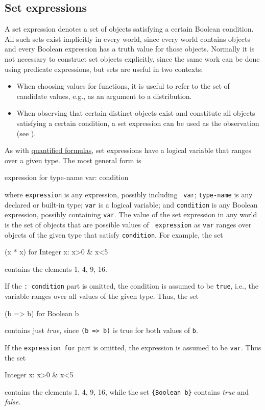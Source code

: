 \documentclass[12pt]{article}
\begin{document}
\subsection{Set expressions}\label{set-section}
A set expression denotes a set of objects satisfying a certain
Boolean condition. All such sets exist implicitly in every world,
since every world contains objects and every Boolean expression
has a truth value for those objects. Normally it is not necessary to
construct set objects explicitly, since the same work can be done
using predicate expressions, but sets are useful in two contexts:
\begin{itemize}
\item When choosing values for functions, it is useful to refer to the
  set of candidate values, e.g., as an argument to a distribution.
\item When observing that certain distinct objects exist
and constitute all objects satisfying a certain condition,
a set expression can be used as the observation (see ).
\end{itemize}
As with \hyperref[quantifier-section]{quantified formulas}, set
expressions have a logical variable that ranges over a given type.
The most general form is
\begin{blogcode}
{expression for type-name var: condition}
\end{blogcode}
where {\tt expression} is any expression, possibly including {\tt
  var}; {\tt type-name} is any declared or built-in type; {\tt var} is
a logical variable; and {\tt condition} is any Boolean expression,
possibly containing {\tt var}. The value of the set expression in any
world is the set of objects that are possible values of {\tt
  expression} as {\tt var} ranges over objects of the given type
that satisfy {\tt condition}. For example, the set
\begin{blogcode}
{(x * x) for Integer x: x>0 & x<5}
\end{blogcode}
contains the elements 1, 4, 9, 16.

If the {\tt : condition} part is omitted, the condition is 
assumed to be {\tt true}, i.e., the variable ranges over all values of
the given type. Thus, the set
\begin{blogcode}
{(b => b) for Boolean b}
\end{blogcode}
contains just {\it true}, since {\tt (b => b)} is true
for both values of {\tt b}.

If the {\tt expression for} part is omitted, the expression
is assumed to be {\tt var}. Thus the set
\begin{blogcode}
{Integer x: x>0 & x<5}
\end{blogcode}
contains the elements 1, 4, 9, 16, while the set 
\verb|{Boolean b}| contains {\it true} and {\it false}.
\end{document}
